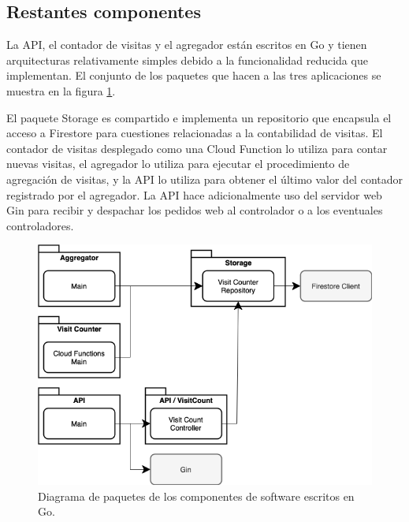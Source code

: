 \documentclass[11pt]{scrartcl}
\begin{document}
\subsection{Restantes componentes}

La API, el contador de visitas y el agregador están escritos en Go y tienen arquitecturas relativamente simples debido a la funcionalidad reducida que implementan. El conjunto de los paquetes que hacen a las tres aplicaciones se muestra en la figura \ref{fig:gomodules-packages}. 

El paquete Storage es compartido e implementa un repositorio que encapsula el acceso a Firestore para cuestiones relacionadas a la contabilidad de visitas. El contador de visitas desplegado como una Cloud Function lo utiliza para contar nuevas visitas, el agregador lo utiliza para ejecutar el procedimiento de agregación de visitas, y la API lo utiliza para obtener el último valor del contador registrado por el agregador. La API hace adicionalmente uso del servidor web Gin para recibir y despachar los pedidos web al controlador o a los eventuales controladores.

\begin{figure}
\begin{center}
\includegraphics[width=\linewidth]{img/gomodules}
\end{center}
\caption{Diagrama de paquetes de los componentes de software escritos en Go.}
\label{fig:gomodules-packages}
\end{figure}
\end{document}
